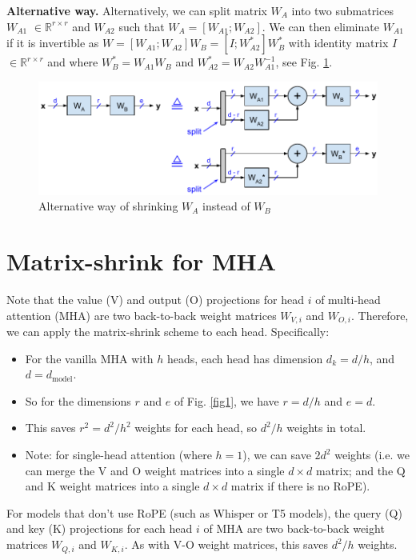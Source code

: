 \documentclass{article}
\newcommand{\eR}[2]{$\in \mathbb{R}^{#1 \times #2}$}  %
\begin{document}
\textbf{Alternative way.} Alternatively, we can split matrix $W_A$ into two submatrices $W_{A1}$ \eR{r}{r} and $W_{A2}$ such that $W_A = [W_{A1}; W_{A2}]$. We can then eliminate $W_{A1}$ if it is invertible as $W = [W_{A1}; W_{A2}] W_B = [I; W_{A2}^\ast] W_B^\ast$ with identity matrix $I$ \eR{r}{r} and where $W_B^\ast = W_{A1} W_B$ and $W_{A2}^\ast = W_{A2} W_{A1}^{-1}$, see Fig. \ref{fig2}.
\begin{figure}[h!] \centering
  \includegraphics[scale=0.88]{../doc/fig/matShrink_fig2.pdf}
  \caption{Alternative way of shrinking $W_A$ instead of $W_B$}
\label{fig2} \end{figure}

\section{Matrix-shrink for MHA}
Note that the value (V) and output (O) projections for head $i$ of multi-head attention (MHA) are two back-to-back weight matrices $W_{V,i}$ and $W_{O,i}$. Therefore, we can apply the matrix-shrink scheme to each head. Specifically:
\begin{itemize}[topsep=-1pt, itemsep=-1pt]
  \item For the vanilla MHA with $h$ heads, each head has dimension $d_k = d / h$, and $d = d_\text{model}$.
  \item So for the dimensions $r$ and $e$ of Fig. \ref{fig1}, we have  $r = d / h$ and $e = d$.
  \item This saves $r^2 = d^2 / h^2$ weights for each head, so $d^2 / h$ weights in total.
  \item Note: for single-head attention (where $h = 1$), we can save $2 d^2$ weights (i.e. we can merge the V and O weight matrices into a single $d \times d$ matrix; and the Q and K weight matrices into a single $d \times d$ matrix if there is no RoPE).
\end{itemize}

For models that don’t use RoPE (such as Whisper or T5 models), the query (Q) and key (K) projections for each head $i$ of MHA are two back-to-back weight matrices $W_{Q,i}$ and $W_{K,i}$. As with V-O weight matrices, this saves $d^2 / h$ weights.
\end{document}
